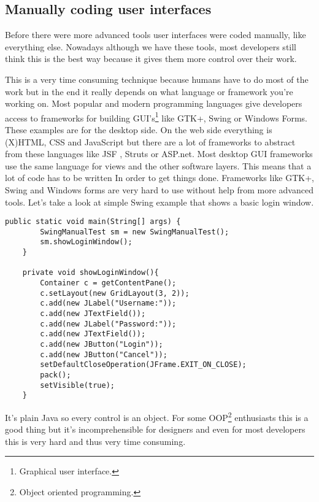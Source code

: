 \subsection{Manually coding user interfaces}
Before there were more advanced tools user interfaces were coded manually, like everything else. Nowadays although we have these tools, most developers still think this is the best way because it gives them more control over their work.

This is a very time consuming technique because humans have to do most of the work but in the end it really depends on what language or framework you're working on. Most popular and modern programming languages give developers access to frameworks for building GUI's\footnote{Graphical user interface.} like GTK+, Swing or Windows Forms. These examples are for the desktop side. On the web side everything is (X)HTML, CSS and JavaScript but there are a lot of frameworks to abstract from these languages like JSF , Struts or ASP.net.
Most desktop GUI frameworks use the same language for views and the other software layers. This means that a lot of code has to be written In order to get things done. Frameworks like GTK+, Swing and Windows forms are very hard to use without help from more advanced tools.
Let's take a look at simple Swing example that shows a basic login window.
\lstset{language=Java}
\begin{lstlisting}[caption={Login window using Swing, coded manually}]
public static void main(String[] args) {
        SwingManualTest sm = new SwingManualTest();
        sm.showLoginWindow();
    }

    private void showLoginWindow(){
        Container c = getContentPane();
        c.setLayout(new GridLayout(3, 2));
        c.add(new JLabel("Username:"));
        c.add(new JTextField());
        c.add(new JLabel("Password:"));
        c.add(new JTextField());
        c.add(new JButton("Login"));
        c.add(new JButton("Cancel"));
        setDefaultCloseOperation(JFrame.EXIT_ON_CLOSE);
        pack();
        setVisible(true);
    }
\end{lstlisting}
It's plain Java so every control is an object. For some OOP\footnote{Object oriented programming.} enthusiasts this is a good thing but it's incomprehensible for designers and even for most developers this is very hard and thus very time consuming.

